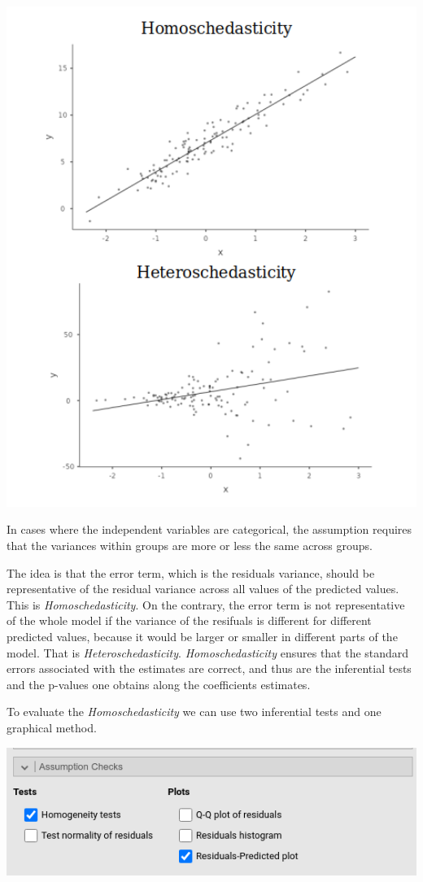 \documentclass[
]{book}
\begin{document}
\includegraphics[width=6.44in]{bookletpics/2_assumptions_theory1}

In cases where the independent variables are categorical, the assumption requires that the variances within groups are more or less the same across groups.

The idea is that the error term, which is the residuals variance, should be representative of the residual variance across all values of the predicted values. This is \emph{Homoschedasticity}. On the contrary, the error term is not representative of the whole model if the variance of the resifuals is different for different predicted values, because it would be larger or smaller in different parts of the model. That is \emph{Heteroschedasticity}. \emph{Homoschedasticity} ensures that the standard errors associated with the estimates are correct, and thus are the inferential tests and the p-values one obtains along the coefficients estimates.

To evaluate the \emph{Homoschedasticity} we can use two inferential tests and one graphical method.

\includegraphics[width=7.69in]{bookletpics/2_assumptions_input1}
\end{document}

